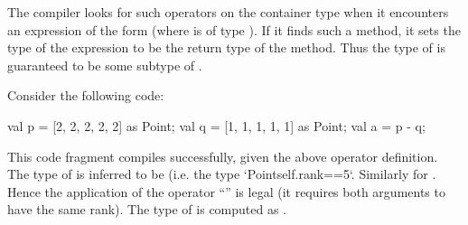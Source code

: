 The compiler looks for such operators on the container type 
when it encounters an expression of the form  (where
 is of type ). If it finds such a method, it sets the
type of the expression  to be the return type of the
method. Thus the type of  is guaranteed to be some subtype
of .

\begin{example}
Consider the following code:  



\begin{xten}
val p  = [2, 2, 2, 2, 2] as Point;
val q = [1, 1, 1, 1, 1] as Point;
val a = p - q;    
\end{xten}
This code fragment compiles successfully, given the above operator definition. 
The type of  is inferred to be  (i.e.{} the type 
\xcd`Point{self.rank==5}`.
Similarly for . Hence the application of the operator ``\Xcd{-}'' is legal (it requires both arguments to have the same rank). The type of  is computed as .
\end{example}
